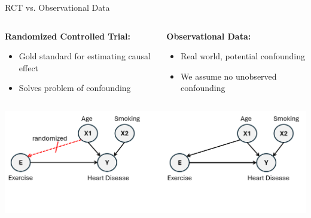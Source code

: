 \documentclass[onlytextwidth,english]{beamer}\usepackage[]{graphicx}\usepackage[]{xcolor}
\begin{document}
\begin{frame}{RCT vs. Observational Data}

\vspace{1cm}

\begin{columns}

\begin{column}{0.43\textwidth}
\textbf{Randomized Controlled Trial:}
\begin{itemize}
    \item Gold standard for estimating causal effect
    \item Solves problem of confounding
\end{itemize}

\end{column}


\begin{column}{0.45\textwidth}
\textbf{Observational Data:}
\begin{itemize}
    \item Real world, potential confounding
    \item We assume no unobserved confounding
\end{itemize}
\end{column}

\end{columns}


\includegraphics[width=\textwidth]{img/RCT_Observational.png}


\end{frame}
\end{document}
